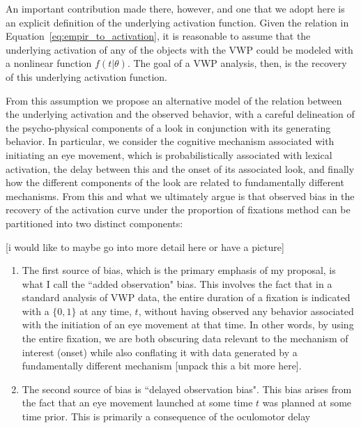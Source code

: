An important contribution made there, however, and one that we adopt here is an explicit definition of the underlying activation function. Given the relation in Equation~\ref{eq:empir_to_activation}, it is reasonable to assume that the underlying activation of any of the objects with the VWP could be modeled with a nonlinear function $f(t|\theta)$. The goal of a VWP analysis, then, is the recovery of this underlying activation function.

From this assumption we propose an alternative model of the relation between the underlying activation and the observed behavior, with a careful delineation of the psycho-physical components of a look in conjunction with its generating behavior. In particular, we consider the cognitive mechanism associated with initiating an eye movement, which is probabilistically associated with lexical activation, the delay between this and the onset of its associated look, and finally how the different components of the look are related to fundamentally different mechanisms. From this and what we ultimately argue is that observed bias in the recovery of the activation curve under the proportion of fixations method can be partitioned into two distinct components:

[i would like to maybe go into more detail here or have a picture]

\begin{enumerate}
\item The first source of bias, which is the primary emphasis of my proposal, is what I call the ``added observation" bias. This involves the fact that in  a standard analysis of VWP data, the entire duration of a fixation is indicated with a $\{0,1\}$  at any time, $t$, without having observed any behavior associated with the initiation of an eye movement at that time. In other words, by using the entire fixation, we are both obscuring data relevant to the mechanism of interest (onset) while also conflating it with data generated by a fundamentally different mechanism [unpack this a bit more here].
\item The second source of bias is ``delayed observation bias". This bias arises from the fact that an eye movement launched at some time $t$ was planned at some time prior. This is primarily a consequence of the oculomotor delay
\end{enumerate}

